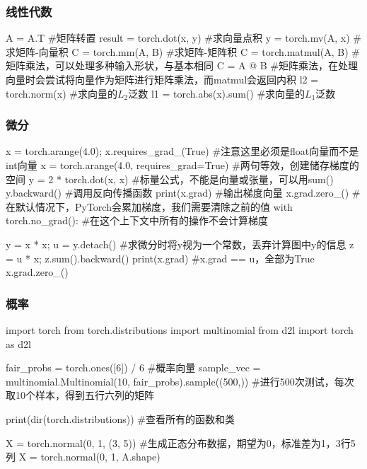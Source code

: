     \subsubsection{线性代数}
      \begin{codeblock}[language=python, caption={linear algebra}]
        A = A.T #矩阵转置
        result = torch.dot(x, y) #求向量点积
        y = torch.mv(A, x) #求矩阵-向量积
        C = torch.mm(A, B) #求矩阵-矩阵积
        C = torch.matmul(A, B) #矩阵乘法，可以处理多种输入形状，与\@ 基本相同
        C = A @ B #矩阵乘法，在处理向量时会尝试将向量作为矩阵进行矩阵乘法，而matmul会返回内积
        l2 = torch.norm(x) #求向量的$L_2$泛数
        l1 = torch.abs(x).sum() #求向量的$L_1$泛数
      \end{codeblock}

    \subsubsection{微分}
      \begin{codeblock}[language=python, caption={differentiation}]
        x = torch.arange(4.0); x.requires_grad_(True) #注意这里必须是float向量而不是int向量
        x = torch.arange(4.0, requires_grad=True) #两句等效，创建储存梯度的空间
        y = 2 * torch.dot(x, x) #标量公式，不能是向量或张量，可以用sum()
        y.backward() #调用反向传播函数
        print(x.grad) #输出梯度向量
        x.grad.zero_() #在默认情况下，PyTorch会累加梯度，我们需要清除之前的值
        with torch.no_grad(): #在这个上下文中所有的操作不会计算梯度

        y = x * x; u = y.detach() #求微分时将y视为一个常数，丢弃计算图中y的信息
        z = u * x; z.sum().backward()
        print(x.grad) #x.grad == u，全部为True
        x.grad.zero_()
      \end{codeblock}

    \subsubsection{概率}
      \begin{codeblock}[language=python, caption={Probability and Statistics}]
        import torch
        from torch.distributions import multinomial
        from d2l import torch as d2l
        
        fair_probs = torch.ones([6]) / 6 #概率向量
        sample_vec = multinomial.Multinomial(10, fair_probs).sample((500,)) 
            #进行500次测试，每次取10个样本，得到五行六列的矩阵

        print(dir(torch.distributions)) #查看所有的函数和类

        X = torch.normal(0, 1, (3, 5)) #生成正态分布数据，期望为0，标准差为1，3行5列
        X = torch.normal(0, 1, A.shape) 
      \end{codeblock}

